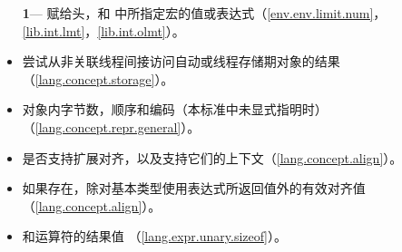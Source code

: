 \begin{itemize} %
  \item[\textbf{1}\hspace{5pt}---]{赋给头，和
    中所指定宏的值或表达式（\ref{env.env.limit.num}，
    \ref{lib.int.lmt}，\ref{lib.int.olmt}）。}
  \item{尝试从非关联线程间接访问自动或线程存储期对象的结果
    （\ref{lang.concept.storage}）。}
  \item{对象内字节数，顺序和编码（本标准中未显式指明时）
    （\ref{lang.concept.repr.general}）。}
  \item{是否支持扩展对齐，以及支持它们的上下文（\ref{lang.concept.align}）。}
  \item{如果存在，除对基本类型使用表达式所返回值外的有效对齐值
    （\ref{lang.concept.align}）。}
  \item{和运算符的结果值
    （\ref{lang.expr.unary.sizeof}）。}
\end{itemize}

